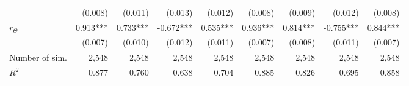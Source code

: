 \begin{table}
{\begin{tabular}{lrrrrrrrr}
                &                  (0.008) &                  (0.011) &                  (0.013) &                  (0.012) &                  (0.008) &                  (0.009) &                  (0.012) &                  (0.008)\\ 
    $r_\Theta$  &                 0.913*** &                 0.733*** &                -0.672*** &                 0.535*** &                 0.936*** &                 0.814*** &                -0.755*** &                 0.844***\\ 
                &                  (0.007) &                  (0.010) &                  (0.012) &                  (0.011) &                  (0.007) &                  (0.008) &                  (0.011) &                  (0.007)\\ 
    \hline
Number of sim.  &                    2,548 &                    2,548 &                    2,548 &                    2,548 &                    2,548 &                    2,548 &                    2,548 &                    2,548\\ 
    $R^2$       &                    0.877 &                    0.760 &                    0.638 &                    0.704 &                    0.885 &                    0.826 &                    0.695 &                    0.858\\ 
    \bottomrule
    \end{tabular}}
\label{table:coefficients_trait-dep-comp}
\end{table}

